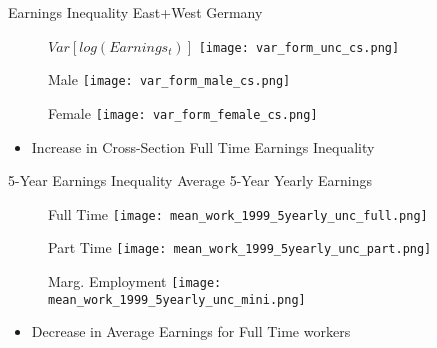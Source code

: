 \documentclass[hyperref={bookmarks=false}]{beamer}
\begin{document}
\begin{appendix}
\begin{frame}{Earnings Inequality}
East+West Germany
\begin{figure}[!t]
\begin{minipage}[b]{0.32\textwidth}{$Var[log(Earnings_t)]$}
\centering
\texttt{[image: var\_form\_unc\_cs.png]}
\end{minipage}
\begin{minipage}[b]{0.32\textwidth}{Male}
\centering
\texttt{[image: var\_form\_male\_cs.png]}
\end{minipage}
\begin{minipage}[b]{0.32\textwidth}{Female}
\centering
\texttt{[image: var\_form\_female\_cs.png]}
\end{minipage}
\end{figure}
\begin{itemize}
\item Increase in Cross-Section Full Time Earnings Inequality
\end{itemize}
\end{frame}


\begin{frame}{5-Year Earnings Inequality}
Average 5-Year Yearly Earnings
\begin{figure}[!t]
\begin{minipage}[b]{0.32\textwidth}{Full Time}
\centering
\texttt{[image: mean\_work\_1999\_5yearly\_unc\_full.png]}
\end{minipage}
\begin{minipage}[b]{0.32\textwidth}{Part Time}
\centering
\texttt{[image: mean\_work\_1999\_5yearly\_unc\_part.png]}
\end{minipage}
\begin{minipage}[b]{0.32\textwidth}{Marg. Employment}
\centering
\texttt{[image: mean\_work\_1999\_5yearly\_unc\_mini.png]}
\end{minipage}
\end{figure}
\begin{itemize}
\item Decrease in Average Earnings for Full Time workers
\end{itemize}
\end{frame}


\end{appendix}
\end{document}
